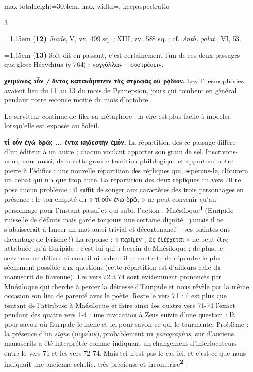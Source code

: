 \documentclass[11pt,twoside]{book}
\newcommand{\italique}[1]{\textit{#1}}
\newcommand{\marqueur}[1]{\textsuperscript{\color{rubricRed}\textbf{#1}}}
\begin{document}
\begin{adjustbox}{max totalheight=30.4cm, max width=\textwidth, keepaspectratio}
\begin{minipage}{\textwidth}
{\begin{multicols}{3}
\par\vspace{1.5pt}
\noindent\hangindent=1.15em {\color{sepiaNote}\textbf{(12)}} \italique{Iliade}, V, vv. 499 sq. ; XIII, vv. 588 sq. ; cf. \italique{Anth. palat.}, VI, 53.
\par\vspace{1.5pt}
\noindent\hangindent=1.15em {\color{sepiaNote}\textbf{(13)}} Soit dit en passant, c'est certainement l'un de ces deux passages que glose Hésychius (γ 764) : γογγύλλειν· συστρέφειν.
\par\vspace{1.5pt}
 \textbf{χειμῶνος οὖν / ὄντος κατακάμπτειν τὰς στροφὰς οὐ ῥᾴδιον.} Les Thesmophories avaient lieu du 11 au 13 du mois de Pyanepsion, jours qui tombent en général pendant notre seconde moitié du mois d'octobre.
\par\vspace{1.5pt}
\noindent Le serviteur continue de filer sa métaphore : la cire est plus facile à modeler lorsqu'elle est exposée au Soleil.
\par\vspace{1.5pt}
 \textbf{τί οὖν ἐγὼ δρῶ; ... ὄντα κηδεστὴν ἐμόν.} La répartition des ce passage diffère d'un éditeur à un autre ; chacun voulant apporter son grain de sel. Inscrivons-nous, nous aussi, dans cette grande tradition philologique et apportons notre pierre à l'édifice : une nouvelle répartition des répliques qui, espérons-le, clôturera un débat qui n'a que trop duré. La répartition des deux répliques du vers 70 ne pose aucun problème : il suffit de songer aux caractères des trois personnages en présence : le ton empoté du « τί οὖν ἐγὼ δρῶ; » ne peut convenir qu'au personnage pour l'instant passif et qui subit l'action : Mnésiloque\marqueur{1} (Euripide ruisselle de défauts mais garde toujours une certaine dignité ; jamais il ne s'abaisserait à lancer un mot aussi trivial et décontenancé – ses plaintes ont davantage de lyrisme !) La réponse : « περίμεν᾽, ὡς ἐξέρχεται » ne peut être attribuée qu'à Euripide : c'est lui qui a besoin de Mnésiloque ; de plus, le serviteur ne délivre ni conseil ni ordre : il se contente de répondre le plus sèchement possible aux questions (cette répartition est d'ailleurs celle du manuscrit de Ravenne). Les vers 72 à 74 sont évidemment prononcés par Mnésiloque qui cherche à percer la détresse d'Euripide et nous révèle par la même occasion son lien de parenté avec le poète. Reste le vers 71 : il est plus que tentant de l'attribuer à Mnésiloque et faire ainsi des quatre vers 71-74 l'exact pendant des quatre vers 1-4 : une invocation à Zeus suivie d'une question : là pour savoir où Euripide le mène et ici pour savoir ce qui le tourmente. Problème : la présence d'un \italique{signe} (σημεῖον), probablement un \italique{paragraphos}, sur d'anciens manuscrits a été interprétée comme indiquant un changement d'interlocuteurs entre le vers 71 et les vers 72-74. Mais tel n'est pas le cas ici, et c'est ce que nous indiquait une ancienne scholie, très précieuse et incomprise\marqueur{2} :

\end{multicols}}
\end{minipage}
\end{adjustbox}
\end{document}

